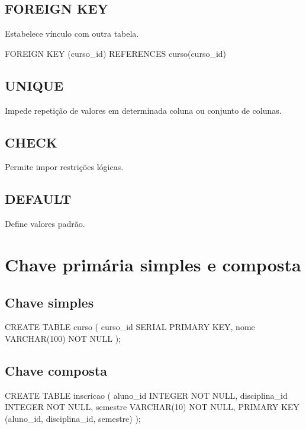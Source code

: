 \subsection{FOREIGN KEY}

Estabelece vínculo com outra tabela.

\begin{sqlcode}
FOREIGN KEY (curso_id) REFERENCES curso(curso_id)
\end{sqlcode}

\subsection{UNIQUE}

Impede repetição de valores em determinada coluna ou conjunto de colunas.

\subsection{CHECK}

Permite impor restrições lógicas.

\subsection{DEFAULT}

Define valores padrão.

\section{Chave primária simples e composta}

\subsection{Chave simples}

\begin{sqlcode}
CREATE TABLE curso (
    curso_id SERIAL PRIMARY KEY,
    nome VARCHAR(100) NOT NULL
);
\end{sqlcode}

\subsection{Chave composta}

\begin{sqlcode}
CREATE TABLE inscricao (
    aluno_id INTEGER NOT NULL,
    disciplina_id INTEGER NOT NULL,
    semestre VARCHAR(10) NOT NULL,
    PRIMARY KEY (aluno_id, disciplina_id, semestre)
);
\end{sqlcode}

